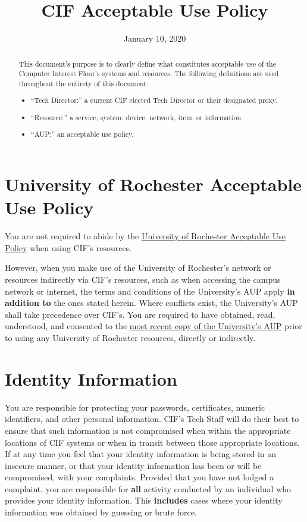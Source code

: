 \documentclass[12pt]{article}
\title{CIF Acceptable Use Policy}
\date{January 10, 2020}
\newcommand{\rochesterAUP}[1]{\href{https://tech.rochester.edu/policies/acceptable-use-policy/}{#1}}
\begin{document}
\maketitle

\begin{abstract}
This document's purpose is to clearly define what constitutes acceptable use of the Computer Interest Floor's systems and resources. The following definitions are used throughout the entirety of this document:

\begin{itemize}
	\item ``Tech Director:'' a current CIF elected Tech Director or their designated proxy.
	\item ``Resource:'' a service, system, device, network, item, or information.
	\item ``AUP:'' an acceptable use policy.
\end{itemize}
\end{abstract}

\section{University of Rochester Acceptable Use Policy} %
\label{sec:rochester-aup}

You are not required to abide by the \rochesterAUP{University of Rochester Acceptable Use Policy} when using CIF's resources.

However, when you make use of the University of Rochester's network or resources indirectly via CIF's resources, such as when accessing the campus network or internet, the terms and conditions of the University's AUP apply \textbf{in addition to} the ones stated herein. Where conflicts exist, the University's AUP shall take precedence over CIF's. You are required to have obtained, read, understood, and consented to the \rochesterAUP{most recent copy of the University's AUP} prior to using any University of Rochester resources, directly or indirectly.


\section{Identity Information} %

You are responsible for protecting your passwords, certificates, numeric identifiers, and other personal information. CIF's Tech Staff will do their best to ensure that such information is not compromised when within the appropriate locations of CIF systems or when in transit between those appropriate locations. If at any time you feel that your identity information is being stored in an insecure manner, or that your identity information has been or will be compromised,  with your complaints. Provided that you have not lodged a complaint, you are responsible for \textbf{all} activity conducted by an individual who provides your identity information. This \textbf{includes} cases where your identity information was obtained by guessing or brute force.
\end{document}
